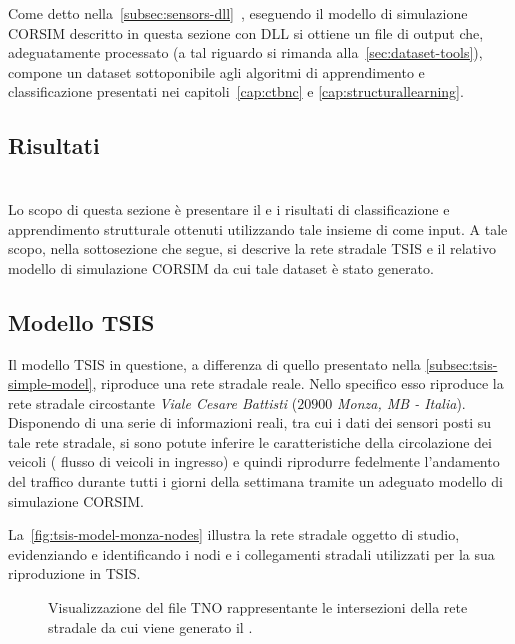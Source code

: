 Come detto nella~\autoref{subsec:sensors-dll}~, eseguendo il modello di simulazione \acs{CORSIM} descritto in questa sezione con  \acs{DLL} si ottiene un file di output che, adeguatamente processato (a tal riguardo si rimanda alla~\vref{sec:dataset-tools}), compone un dataset sottoponibile agli algoritmi di apprendimento e classificazione presentati nei capitoli~\ref{cap:ctbnc} e \ref{cap:structurallearning}.

\subsection{Risultati}
\omissis{}

\section{}\label{sec:dataset-2}
Lo scopo di questa sezione è presentare il  e i risultati di classificazione e apprendimento strutturale ottenuti utilizzando tale insieme di \emph{} come input. A tale scopo, nella sottosezione che segue, si descrive la rete stradale \acs{TSIS} e il relativo modello di simulazione \acs{CORSIM} da cui tale dataset è stato generato.

\subsection{Modello TSIS}\label{subsec:tsis-monza-model}
Il modello \acs{TSIS} in questione, a differenza di quello presentato nella \autoref{subsec:tsis-simple-model}, riproduce una rete stradale reale. Nello specifico esso riproduce la rete stradale circostante \emph{Viale Cesare Battisti} ($20900$ \emph{Monza, MB - Italia}). Disponendo di una serie di informazioni reali, tra cui i dati dei sensori posti su tale rete stradale, si sono potute inferire le caratteristiche della circolazione dei veicoli (\eg{} flusso di veicoli in ingresso) e quindi riprodurre fedelmente l'andamento del traffico durante tutti i giorni della settimana tramite un adeguato modello di simulazione \acs{CORSIM}.

La~\vref{fig:tsis-model-monza-nodes} illustra la rete stradale oggetto di studio, evidenziando e identificando i nodi e i collegamenti stradali utilizzati per la sua riproduzione in \acs{TSIS}.
\begin{figure}
  \centering
  \captionsetup[subfigure]{labelformat=empty}
  \label{fig:tsis-model-monza-nodes}
\end{figure}
\begin{figure}
  \centering
  \captionsetup{type=figure}
  \captionsetup[subfigure]{labelformat=empty}
  \caption[Intersezioni della rete stradale del ]{Visualizzazione del file \acs{TNO} rappresentante le intersezioni della rete stradale da cui viene generato il .}
\end{figure}

